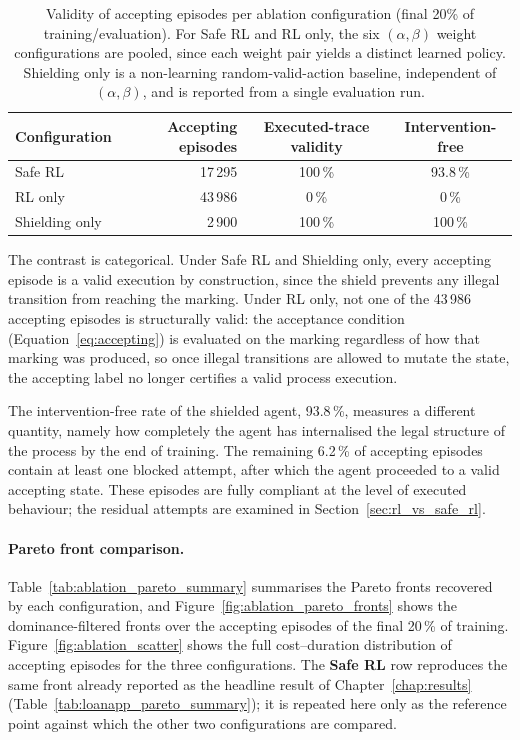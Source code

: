 \begin{table}[H]
\centering
\caption{Validity of accepting episodes per ablation configuration (final 20\% of training/evaluation). For Safe RL and RL only, the six $(\alpha,\beta)$ weight configurations are pooled, since each weight pair yields a distinct learned policy. Shielding only is a non-learning random-valid-action baseline, independent of $(\alpha,\beta)$, and is reported from a single evaluation run.}
\label{tab:ablation_validity}
{\renewcommand{\arraystretch}{1.3}
\setlength{\tabcolsep}{4pt}
\begin{tabular}{lrcc}
\toprule
\textbf{Configuration} & \textbf{Accepting episodes} &
\textbf{Executed-trace validity} & \textbf{Intervention-free} \\
\midrule
Safe \ac{RL}    & 17\,295 & 100\,\% & 93.8\,\% \\
\ac{RL} only    & 43\,986 & 0\,\%   & 0\,\%    \\
Shielding only  & 2\,900  & 100\,\% & 100\,\%  \\
\bottomrule
\end{tabular}}
\end{table}

The contrast is categorical. Under Safe \ac{RL} and Shielding only,
every accepting episode is a valid execution by construction, since the
shield prevents any illegal transition from reaching the marking. Under
\ac{RL} only, not one of the 43\,986 accepting episodes is structurally
valid: the acceptance condition (Equation~\ref{eq:accepting}) is
evaluated on the marking regardless of how that marking was produced,
so once illegal transitions are allowed to mutate the state, the
accepting label no longer certifies a valid process execution.

The intervention-free rate of the shielded agent, 93.8\,\%, measures a
different quantity, namely how completely the agent has internalised
the legal structure of the process by the end of training. The
remaining 6.2\,\% of accepting episodes contain at least one blocked
attempt, after which the agent proceeded to a valid accepting state.
These episodes are fully compliant at the level of executed behaviour;
the residual attempts are examined in
Section~\ref{sec:rl_vs_safe_rl}.

\paragraph{Pareto front comparison.}
Table~\ref{tab:ablation_pareto_summary} summarises the Pareto fronts
recovered by each configuration, and
Figure~\ref{fig:ablation_pareto_fronts} shows the dominance-filtered
fronts over the accepting episodes of the final 20\,\% of training.
Figure~\ref{fig:ablation_scatter} shows the full cost--duration
distribution of accepting episodes for the three configurations. The
\textbf{Safe \ac{RL}} row reproduces the same front already reported as
the headline result of Chapter~\ref{chap:results}
(Table~\ref{tab:loanapp_pareto_summary}); it is repeated here only as
the reference point against which the other two configurations are
compared.

